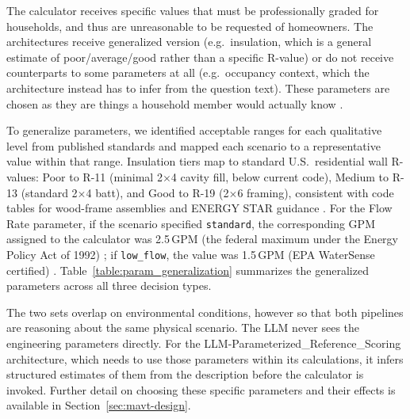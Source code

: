 \documentclass[final,3p,times]{elsarticle}
\begin{document}
The calculator receives specific values that must be professionally graded for households, and thus are unreasonable to be requested of homeowners. The architectures receive generalized version (e.g.\ insulation, which is a general estimate of poor/average/good rather than a specific R-value) or do not receive counterparts to some parameters at all (e.g.\ occupancy context, which the architecture instead has to infer from the question text). These parameters are chosen as they are things a household member would actually know \cite{doehesscore2021}.

To generalize parameters, we identified acceptable ranges for each qualitative level from published standards and mapped each scenario to a representative value within that range. Insulation tiers map to standard U.S.\ residential wall R-values: Poor to R-11 (minimal 2$\times$4 cavity fill, below current code), Medium to R-13 (standard 2$\times$4 batt), and Good to R-19 (2$\times$6 framing), consistent with code tables for wood-frame assemblies and ENERGY STAR guidance \cite{cec_ja43_2013,energystar_insulation2023}. For the Flow Rate parameter, if the scenario specified \texttt{standard}, the corresponding GPM assigned to the calculator was 2.5\,GPM (the federal maximum under the Energy Policy Act of 1992) \cite{epawatersense}; if \texttt{low\_flow}, the value was 1.5\,GPM (EPA WaterSense certified) \cite{epawatersense}. Table~\ref{table:param_generalization} summarizes the generalized parameters across all three decision types.

The two sets overlap on environmental conditions, however so that both pipelines are reasoning about the same physical scenario. The LLM never sees the engineering parameters directly. For the LLM-Parameterized\_Reference\_Scoring architecture, which needs to use those parameters within its calculations, it infers structured estimates of them from the description before the calculator is invoked. Further detail on choosing these specific parameters and their effects is available in Section~\ref{sec:mavt-design}.
\end{document}
